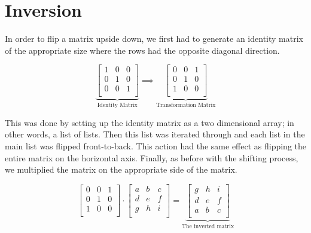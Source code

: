 \section{Inversion}

In order to flip a matrix upside down, we first had to generate an identity matrix of the appropriate size where the rows had the opposite diagonal direction.

    \[
      \underbrace{
        \begin{bmatrix}
          1&0&0\\
          0&1&0\\
          0&0&1\\
        \end{bmatrix}
      }_{\text{Identity Matrix}}
      \implies
      \underbrace{
        \begin{bmatrix}
          0&0&1\\
          0&1&0\\
          1&0&0\\
        \end{bmatrix}
      }_{\text{Transformation Matrix}}
    \]

This was done by setting up the identity matrix as a two dimensional array; in other words, a list of lists. Then this list was iterated through and each list in the main list was flipped front-to-back. This action had the same effect as flipping the entire matrix on the horizontal axis. Finally, as before with the shifting process, we multiplied the matrix on the appropriate side of the matrix.

    \[
      \begin{bmatrix}
        0&0&1\\
        0&1&0\\
        1&0&0\\
      \end{bmatrix}
      \cdot
      \begin{bmatrix}
        a&b&c\\
        d&e&f\\
        g&h&i\\
      \end{bmatrix}
      =
      \underbrace{
      \begin{bmatrix}
        g&h&i\\
        d&e&f\\
        a&b&c\\
      \end{bmatrix}
      }_{\text{The inverted
      matrix}}
    \]

